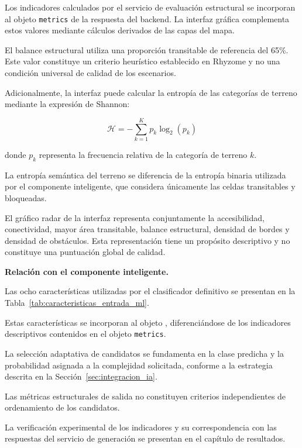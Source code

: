 \FloatBarrier

Los indicadores calculados por el servicio de evaluación estructural se incorporan al objeto \texttt{metrics} de la respuesta del backend. La interfaz gráfica complementa estos valores mediante cálculos derivados de las capas del mapa.

El balance estructural utiliza una proporción transitable de referencia del 65\%. Este valor constituye un criterio heurístico establecido en Rhyzome y no una condición universal de calidad de los escenarios.

Adicionalmente, la interfaz puede calcular la entropía de las categorías de terreno mediante la expresión de Shannon:

\begin{equation}
	\mathcal{H} =
	-\sum_{k=1}^{K}p_k\log_2(p_k)
	\label{eq:entropia_terreno}
\end{equation}

donde $p_k$ representa la frecuencia relativa de la categoría de terreno $k$.

La entropía semántica del terreno se diferencia de la entropía binaria utilizada por el componente inteligente, que considera únicamente las celdas transitables y bloqueadas.

El gráfico radar de la interfaz representa conjuntamente la accesibilidad, conectividad, mayor área transitable, balance estructural, densidad de bordes y densidad de obstáculos. Esta representación tiene un propósito descriptivo y no constituye una puntuación global de calidad.

\textbf{Relación con el componente inteligente.}

Las ocho características utilizadas por el clasificador definitivo se presentan en la Tabla~\ref{tab:caracteristicas_entrada_ml}.

Estas características se incorporan al objeto , diferenciándose de los indicadores descriptivos contenidos en el objeto \texttt{metrics}.

La selección adaptativa de candidatos se fundamenta en la clase predicha y la probabilidad asignada a la complejidad solicitada, conforme a la estrategia descrita en la Sección~\ref{sec:integracion_ia}.

Las métricas estructurales de salida no constituyen criterios independientes de ordenamiento de los candidatos.

La verificación experimental de los indicadores y su correspondencia con las respuestas del servicio de generación se presentan en el capítulo de resultados.

